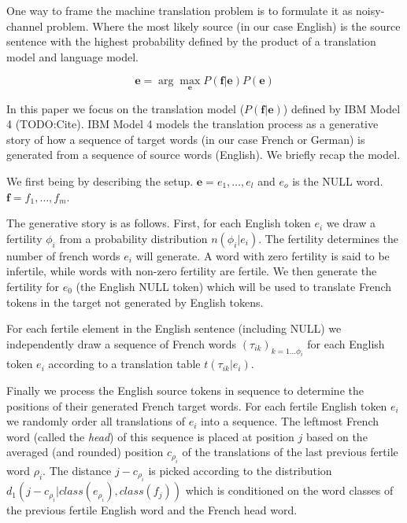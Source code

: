 One way to frame the machine translation problem is to formulate it as
noisy-channel problem.  Where the most likely source (in our case
English) is the source sentence with the highest probability defined
by the product of a translation model and language model.

\begin{equation}
  \label{eq:noisy-channel-argmax}
  \mathbf{e} = \arg\max_{\mathbf{e}} P(\mathbf{f}|\mathbf{e}) P(\mathbf{e})
\end{equation}

In this paper we focus on the translation model
($P(\mathbf{f}|\mathbf{e})$) defined by IBM Model 4 (TODO:Cite).  IBM
Model 4 models the translation process as a generative story of how a
sequence of target words (in our case French or German) is generated
from a sequence of source words (English).  We briefly recap the
model.

We first being by describing the setup.  $\mathbf{e} = e_1, \dots,
e_l$ and $e_o$ is the NULL word.  $\mathbf{f} = f_1, \dots, f_m$.

The generative story is as follows.  First, for each English token
$e_i$ we draw a fertility $\phi_i$ from a probability distribution
$n(\phi_i|e_i)$.  The fertility determines the number of french words
$e_i$ will generate.  A word with zero fertility is said to be
infertile, while words with non-zero fertility are fertile.  We then
generate the fertility for $e_0$ (the English NULL token) which will
be used to translate French tokens in the target not generated by
English tokens.

For each fertile element in the English sentence (including NULL) we
independently draw a sequence of French words
$(\tau_{ik})_{k=1\ldots\phi_i}$ for each English token $e_i$ according
to a translation table $t(\tau_{ik}|e_i)$.

Finally we process the English source tokens in sequence to determine
the positions of their generated French target words.  For each
fertile English token $e_i$ we randomly order all translations of
$e_i$ into a sequence.  The leftmost French word (called the
\emph{head}) of this sequence is placed at position $j$ based on the
averaged (and rounded) position $c_{\rho_{i}}$ of the translations of
the last previous fertile word $\rho_{i}$.  The distance
$j-c_{\rho_{i}}$ is picked according to the distribution
$d_{1}(j-c_{\rho_{i}}|\mathit{class}(e_{\rho_{i}}),\mathit{class}(f_{j}))$
which is conditioned on the word classes of the previous fertile
English word and the French head word.

